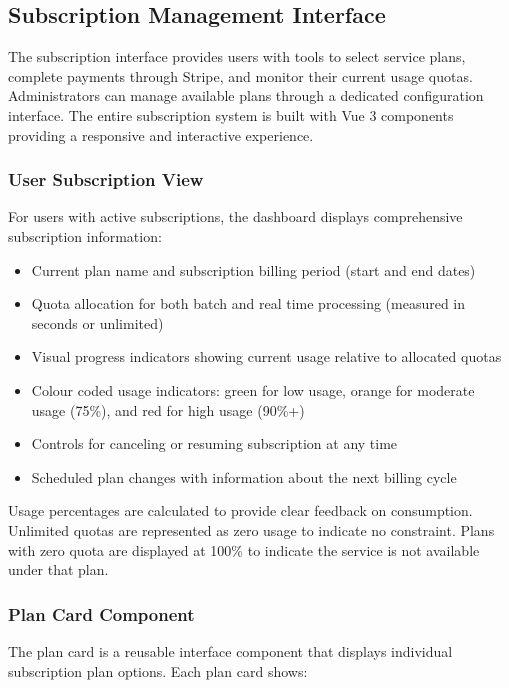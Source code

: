 \subsection{Subscription Management Interface}
\label{sec:frontend_subscription}

The subscription interface provides users with tools to select service plans, complete payments through Stripe, and monitor their current usage quotas. Administrators can manage available plans through a dedicated configuration interface. The entire subscription system is built with Vue 3 components providing a responsive and interactive experience.

\subsubsection{User Subscription View}

For users with active subscriptions, the dashboard displays comprehensive subscription information:

\begin{itemize}
    \item Current plan name and subscription billing period (start and end dates)
    \item Quota allocation for both batch and real time processing (measured in seconds or unlimited)
    \item Visual progress indicators showing current usage relative to allocated quotas
    \item Colour coded usage indicators: green for low usage, orange for moderate usage (75\%), and red for high usage (90\%+)
    \item Controls for canceling or resuming subscription at any time
    \item Scheduled plan changes with information about the next billing cycle
\end{itemize}

Usage percentages are calculated to provide clear feedback on consumption. Unlimited quotas are represented as zero usage to indicate no constraint. Plans with zero quota are displayed at 100\% to indicate the service is not available under that plan.

\subsubsection{Plan Card Component}

The plan card is a reusable interface component that displays individual subscription plan options. Each plan card shows:


